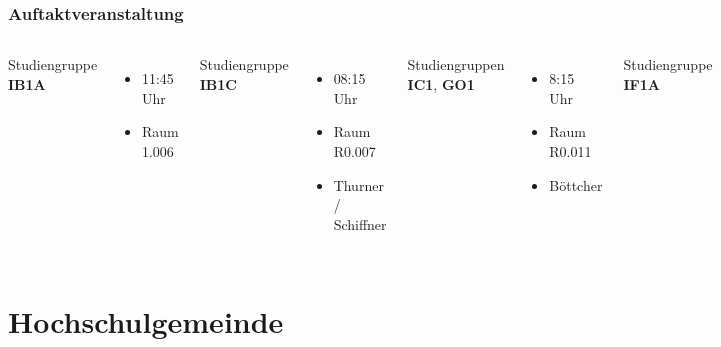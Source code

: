 \documentclass{beamer}
\begin{document}
    \begin{frame} 
    	\frametitle{Auftaktveranstaltung}
    	\begin{columns}
    		Studiengruppe \textbf{IB1A}
    		\begin{itemize}
    			\item 11:45 Uhr
    			\item Raum 1.006
    		\end{itemize}
    		\bigskip
    		Studiengruppe \textbf{IB1C}
    		\begin{itemize}
    			\item 08:15 Uhr
    			\item Raum R0.007
    			\item Thurner / Schiffner
    		\end{itemize}
    		\bigskip
    		Studiengruppen \textbf{IC1}, \textbf{GO1}
    		\begin{itemize}
    			\item 8:15 Uhr
    			\item Raum R0.011
    			\item Böttcher
    		\end{itemize}
    		Studiengruppe \textbf{IF1A}
    		\begin{itemize}
    			\item 12:30 Uhr
    			\item Raum R1.007
    			\item Hobelsberger
    		\end{itemize}
    		\bigskip
    		Studiengruppe \textbf{IF1B}
    		\begin{itemize}
    			\item 12:30 Uhr
    			\item Raum R2.007
    			\item Orehek
    		\end{itemize}
    	\end{columns}
    \end{frame}
    
    \section{Hochschulgemeinde}
    
\end{document}
